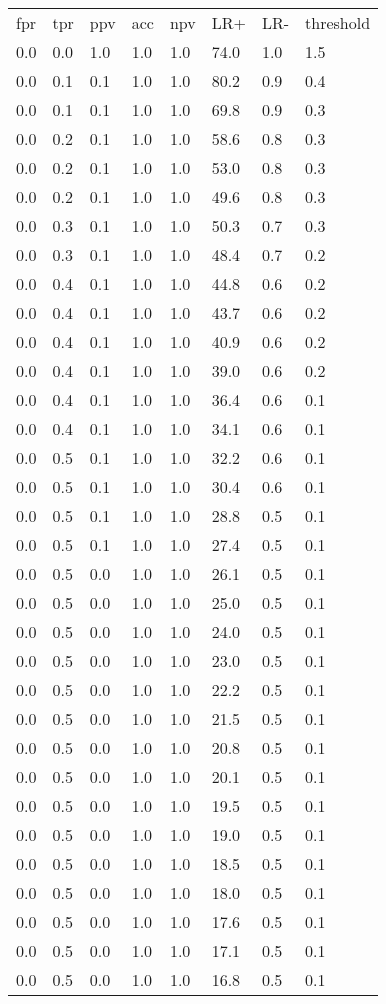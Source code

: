 \begin{tabular}{L{1in}|L{1in}|L{1in}|L{1in}|L{1in}|L{1in}|L{1in}|L{1in}}\hline
fpr&tpr&ppv&acc&npv&LR+&LR-&threshold\\
0.0&0.0&1.0&1.0&1.0&74.0&1.0&1.5\\
0.0&0.1&0.1&1.0&1.0&80.2&0.9&0.4\\
0.0&0.1&0.1&1.0&1.0&69.8&0.9&0.3\\
0.0&0.2&0.1&1.0&1.0&58.6&0.8&0.3\\
0.0&0.2&0.1&1.0&1.0&53.0&0.8&0.3\\
0.0&0.2&0.1&1.0&1.0&49.6&0.8&0.3\\
0.0&0.3&0.1&1.0&1.0&50.3&0.7&0.3\\
0.0&0.3&0.1&1.0&1.0&48.4&0.7&0.2\\
0.0&0.4&0.1&1.0&1.0&44.8&0.6&0.2\\
0.0&0.4&0.1&1.0&1.0&43.7&0.6&0.2\\
0.0&0.4&0.1&1.0&1.0&40.9&0.6&0.2\\
0.0&0.4&0.1&1.0&1.0&39.0&0.6&0.2\\
0.0&0.4&0.1&1.0&1.0&36.4&0.6&0.1\\
0.0&0.4&0.1&1.0&1.0&34.1&0.6&0.1\\
0.0&0.5&0.1&1.0&1.0&32.2&0.6&0.1\\
0.0&0.5&0.1&1.0&1.0&30.4&0.6&0.1\\
0.0&0.5&0.1&1.0&1.0&28.8&0.5&0.1\\
0.0&0.5&0.1&1.0&1.0&27.4&0.5&0.1\\
0.0&0.5&0.0&1.0&1.0&26.1&0.5&0.1\\
0.0&0.5&0.0&1.0&1.0&25.0&0.5&0.1\\
0.0&0.5&0.0&1.0&1.0&24.0&0.5&0.1\\
0.0&0.5&0.0&1.0&1.0&23.0&0.5&0.1\\
0.0&0.5&0.0&1.0&1.0&22.2&0.5&0.1\\
0.0&0.5&0.0&1.0&1.0&21.5&0.5&0.1\\
0.0&0.5&0.0&1.0&1.0&20.8&0.5&0.1\\
0.0&0.5&0.0&1.0&1.0&20.1&0.5&0.1\\
0.0&0.5&0.0&1.0&1.0&19.5&0.5&0.1\\
0.0&0.5&0.0&1.0&1.0&19.0&0.5&0.1\\
0.0&0.5&0.0&1.0&1.0&18.5&0.5&0.1\\
0.0&0.5&0.0&1.0&1.0&18.0&0.5&0.1\\
0.0&0.5&0.0&1.0&1.0&17.6&0.5&0.1\\
0.0&0.5&0.0&1.0&1.0&17.1&0.5&0.1\\
0.0&0.5&0.0&1.0&1.0&16.8&0.5&0.1\\

\end{tabular}
